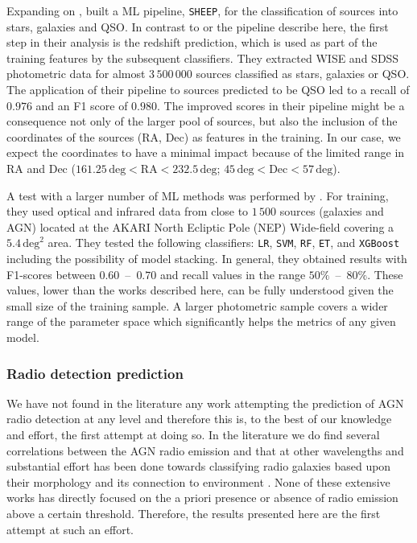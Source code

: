 \documentclass{aa}
\begin{document}
Expanding on \citet{2020A&A...639A..84C}, \citet{2022arXiv220402080C} built a ML pipeline, \texttt{SHEEP}, for the classification of sources into stars, galaxies and QSO. In contrast to \citet{2020A&A...639A..84C} or the pipeline describe here, the first step in their analysis is the redshift prediction, which is used as part of the training features by the subsequent classifiers. They extracted WISE and SDSS \citep[DR15;][]{2019ApJS..240...23A} photometric data for almost $3\,500\,000$ sources classified as stars, galaxies or QSO. The application of their pipeline to sources predicted to be QSO led to a recall of $0.976$ and an F1 score of $0.980$. The improved scores in their pipeline might be a consequence not only of the larger pool of sources, but also the inclusion of the coordinates of the sources (RA, Dec) as features in the training. In our case, we expect the coordinates to have a minimal impact because of the limited range in RA and Dec (${161.25\,\mathrm{deg} < \mathrm{RA} <232.5\,\mathrm{deg}}$; ${45\,\mathrm{deg} < \mathrm{Dec} < 57\,\mathrm{deg}}$). %

A test with a larger number of ML methods was performed by \citet{2021A&A...651A.108P}. For training, they used optical and infrared data from close to $1\,500$ sources (galaxies and AGN) located at the AKARI North Ecliptic Pole (NEP) Wide-field \citep{2009PASJ...61..375L, 2012A&A...548A..29K} covering a $5.4\, \mathrm{deg}^{2}$ area. They tested  the following classifiers: \verb|LR|, \verb|SVM|, \verb|RF|, \verb|ET|, and \verb|XGBoost| including the possibility of model stacking. In general, they obtained results with F1-scores between $0.60$~--~$0.70$ and recall values in the range $50\%$~--~$80\%$. 
These values, lower than the works described here, can be fully understood given the small size of the training sample. A larger photometric sample covers a wider range of the parameter space which significantly helps the metrics of any given model.

\subsubsection{Radio detection prediction}\label{sec:previous_radio_detection}

We have not found in the literature any work attempting the prediction of AGN radio detection at any level and therefore this is, to the best of our knowledge and effort, the first attempt at doing so. In the literature we do find several correlations between the AGN radio emission and that at other wavelengths \citep[e.g. with infrared emission,][]{1985ApJ...298L...7H, 1992ARA&A..30..575C} and substantial effort has been done towards classifying radio galaxies based upon their morphology \citep[e.g.][FRI, FRII, bent jets, etc.]{2017ApJS..230...20A, 2019MNRAS.482.1211W} and its connection to environment \citep{2008A&ARv..15...67M, 2022A&ARv..30....6M}. None of these extensive works has directly focused on the a priori presence or absence of radio emission above a certain threshold. Therefore, the results presented here are the first attempt at such an effort.
\end{document}
